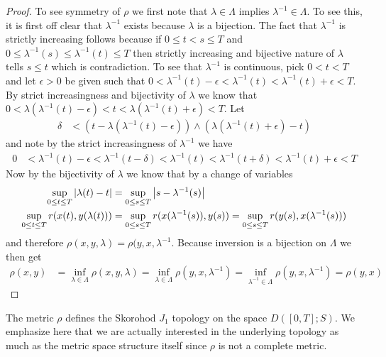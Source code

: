 \begin{proof}
To see symmetry of $\rho$ we first note that $\lambda \in \Lambda$
implies $\lambda^{-1} \in \Lambda$.   To see this, it is first off
clear that $\lambda^{-1}$ exists because $\lambda$ is a bijection.
The fact that $\lambda^{-1}$ is strictly increasing follows because
if $0 \leq t < s \leq T$ and $0 \leq \lambda^{-1}(s) \leq \lambda^{-1}(t) \leq T$ then strictly
increasing and bijective nature of $\lambda$ tells $s \leq t$ which is
contradiction.  To see that $\lambda^{-1}$ is continuous, pick $0 < t
< T$ and let $\epsilon > 0$ be given such that $0 < \lambda^{-1}(t) -
\epsilon < \lambda^{-1}(t)  < \lambda^{-1}(t) + \epsilon < T$.  By strict increasingness
and bijectivity 
of $\lambda$ we know that $0 < \lambda(\lambda^{-1}(t) -
\epsilon) < t < \lambda(\lambda^{-1}(t) + \epsilon) < T$.  Let 
\begin{align*}
\delta &< ( t -  \lambda(\lambda^{-1}(t) -\epsilon)) \wedge (
\lambda(\lambda^{-1}(t) +\epsilon) -t)
\end{align*}
and note by the strict increasingness of $\lambda^{-1}$ we have
\begin{align*}
0 &< \lambda^{-1}(t) -\epsilon < \lambda^{-1}(t - \delta) <
\lambda^{-1}(t) < \lambda^{-1}(t + \delta) < \lambda^{-1}(t) + \epsilon
< T
\end{align*}
Now by the bijectivity of $\lambda$ we know that by a change of variables
\begin{align*}
\sup_{0 \leq t \leq T} \left \vert \lambda(t) - t \right \vert &= \sup_{0 \leq s \leq T} \left \vert s - \lambda^{-1}(s) \right \vert \\
\sup_{0 \leq t \leq T} r(x(t), y(\lambda(t))) &= \sup_{0 \leq s \leq
  T} r(x(\lambda^{-1}(s)), y(s)) = 
\sup_{0 \leq s \leq  T} r(y(s), x(\lambda^{-1}(s)))\\
\end{align*}
and therefore $\rho(x,y,\lambda) = \rho(y,x,\lambda^{-1}$.  Because
inversion is a bijection on $\Lambda$ we then get
\begin{align*}
\rho(x,y) &= \inf_{\lambda \in \Lambda} \rho(x,y,\lambda) =
\inf_{\lambda \in \Lambda} \rho(y,x,\lambda^{-1}) = \inf_{\lambda^{-1}
  \in \Lambda} \rho(y,x,\lambda^{-1}) = \rho(y,x)
\end{align*}
\end{proof}

The metric $\rho$ defines the Skorohod $J_1$ topology on the space
$D([0,T];S)$.  We emphasize here that we are actually interested in
the underlying topology as much as the metric space structure itself
since $\rho$ is not a complete metric.

